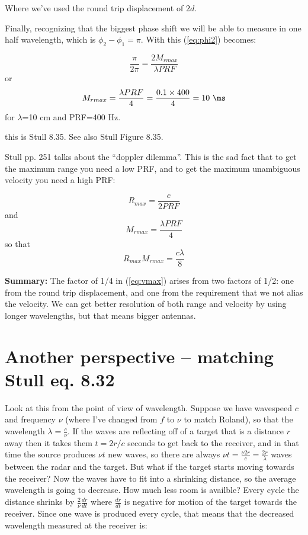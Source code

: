\documentclass[12pt]{article}
\begin{document}
\begin{itemize}
Where we've used the round trip displacement of $2d$.

Finally, recognizing that the biggest phase shift we will be
able to measure in one half wavelength, which is 
$\phi_2 - \phi_1 = \pi$.  With this (\ref{eq:phi2})
becomes:

\begin{equation}
  \label{eq:phi3}
  \frac{ \pi}{2 \pi} =  \frac{ 2M_{r max}}{\lambda PRF}
\end{equation}
or 
\begin{equation}
  \label{eq:phi4}
M_{r max} = \frac{\lambda PRF }{4} = \frac{0.1 \times 400 }{4} = 10\ \ms
\end{equation}
for $\lambda$=10 cm and PRF=400 Hz.
\end{itemize}
this is Stull 8.35.  See also Stull Figure 8.35.

Stull pp. 251 talks about the ``doppler dilemma''.
This is the sad fact that to get the maximum range you need
 a low PRF, and to get the maximum unambiguous velocity you need
a high PRF:

\begin{equation}
  \label{eq:rmax}
  R_{max} = \frac{c }{2 PRF}
\end{equation}
and
\begin{equation}
  \label{eq:vmax}
  M_{rmax} = \frac{\lambda PRF }{4}
\end{equation}
so that
\begin{equation}
  \label{eq:total}
  R_{max} M_{rmax} = \frac{c \lambda }{8}
\end{equation}

\textbf{Summary: }  The factor of 1/4 in (\ref{eq:vmax}) arises from two factors
of 1/2:  one from the round trip displacement, and one from the requirement that
we not alias the velocity.  We can get better resolution of both range and velocity
by using longer wavelengths, but that means bigger antennas.


\section{Another perspective -- matching Stull eq. 8.32}
\label{sec:another-perspective}

Look at this from the point of view of wavelength.  Suppose
we have wavespeed $c$ and frequency $\nu$ (where I've changed
from $f$ to $\nu$ to match Roland), so that the wavelength
$\lambda = \frac{ c}{\nu}$.   If the waves are reflecting off
of a target that is a distance $r$ away then it takes them
$t=2r/c$ seconds to get back to the receiver, and in that
time the source produces $\nu t$ new waves, so there are always
$\nu t=\frac{\nu 2r }{c} = \frac{ 2r}{\lambda}$ waves between
the radar and the target.  But what if the target starts moving
towards the receiver?  Now the waves have to fit into a
shrinking distance, so the average wavelength is going to
decrease.  How much less room is availble?  Every cycle the
distance shrinks by $\frac{2 }{\nu} \frac{ dr}{dt} $ where $\frac{ dr}{dt}$
is negative for motion of the target towards the receiver.  
Since one wave is produced every cycle, that
means that the decreased wavelength measured at the receiver is:
\end{document}
